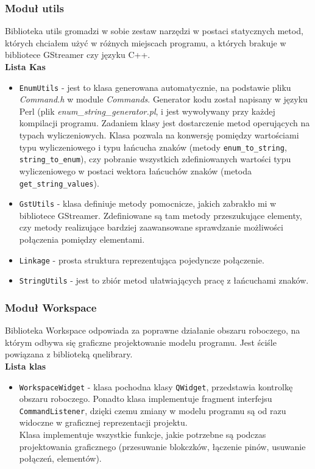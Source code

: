 \documentclass[12pt]{article}
\begin{document}
\subsubsection{Moduł utils}
Biblioteka utils gromadzi w sobie zestaw narzędzi w postaci statycznych metod, których chciałem użyć w różnych miejscach programu, a których brakuje w bibliotece GStreamer czy języku C++.\\
\textbf{Lista Kas}
\begin{itemize}
 \setlength{\itemsep}{0em}
\item \texttt{EnumUtils} - jest to klasa generowana automatycznie, na podstawie pliku \textit{Command.h} w module \textit{Commands}. Generator kodu został napisany w języku Perl (plik \textit{enum\_string\_generator.pl}, i jest wywoływany przy każdej kompilacji programu.
Zadaniem klasy jest dostarczenie metod operujących na typach wyliczeniowych. Klasa pozwala na konwersję pomiędzy wartościami typu wyliczeniowego i typu łańcucha znaków (metody \texttt{enum\_to\_string}, \texttt{string\_to\_enum}), czy pobranie wszystkich zdefiniowanych wartości typu wyliczeniowego w postaci wektora łańcuchów znaków (metoda \texttt{get\_string\_values}).
\item \texttt{GstUtils} - klasa definiuje metody pomocnicze, jakich zabrakło mi w bibliotece GStreamer. Zdefiniowane są tam metody przeszukujące elementy, czy metody realizujące bardziej zaawansowane sprawdzanie możliwości połączenia pomiędzy elementami.
\item \texttt{Linkage} - prosta struktura reprezentująca pojedyncze połączenie.
\item \texttt{StringUtils} - jest to zbiór metod ułatwiających pracę z łańcuchami znaków.
\end{itemize}
\subsubsection{Moduł Workspace}
Biblioteka Workspace odpowiada za poprawne działanie obszaru roboczego, na którym odbywa się graficzne projektowanie modelu programu. Jest ściśle powiązana z biblioteką qnelibrary.\\
\textbf{Lista klas}
\begin{itemize}
  \setlength{\itemsep}{0em}
\item \texttt{WorkspaceWidget} - klasa pochodna klasy \texttt{QWidget}, przedstawia kontrolkę obszaru roboczego. Ponadto klasa implementuje fragment interfejsu \texttt{CommandListener}, dzięki czemu zmiany w modelu programu są od razu widoczne w graficznej reprezentacji projektu. \\
Klasa implementuje wszystkie funkcje, jakie potrzebne są podczas projektowania graficznego (przesuwanie blokczków, łączenie pinów, usuwanie połączeń, elementów).
\end{itemize}
\end{document}
